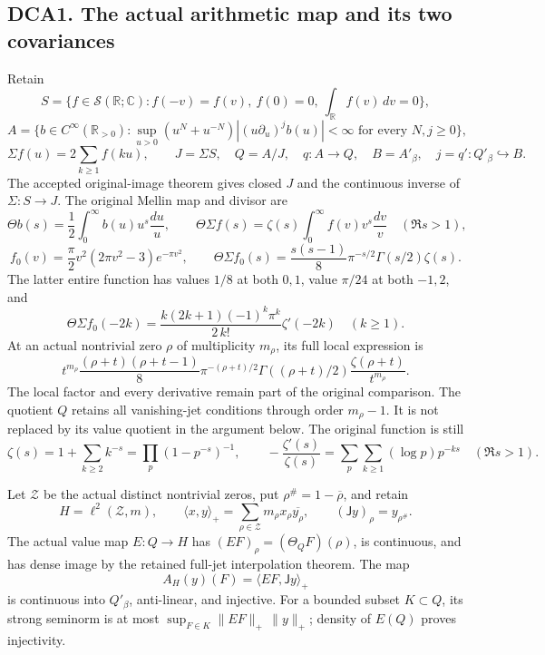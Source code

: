 \subsection{DCA1. The actual arithmetic map and its two
covariances}\label{dca1.-the-actual-arithmetic-map-and-its-two-covariances}

Retain \[
S=\{f\in\mathcal S(\mathbb R;\mathbb C):f(-v)=f(v),\ f(0)=0,\ \int_{\mathbb R}f(v)\,dv=0\},
\] \[
A=\{b\in C^\infty(\mathbb R_{>0}):
\sup_{u>0}(u^N+u^{-N})|(u\partial_u)^j b(u)|<\infty
\text{ for every }N,j\geq0\},
\] \[
\Sigma f(u)=2\sum_{k\geq1}f(ku),\qquad
J=\Sigma S,\quad Q=A/J,\quad q:A\to Q,\quad
B=A'_\beta,\quad j=q':Q'_\beta\hookrightarrow B.
\tag{DCA1.1}
\] The accepted original-image theorem gives closed \(J\) and the
continuous inverse of \(\Sigma:S\to J\). The original Mellin map and
divisor are \[
\Theta b(s)=\frac12\int_0^\infty b(u)u^s\frac{du}{u},\qquad
\Theta\Sigma f(s)=\zeta(s)\int_0^\infty f(v)v^s\frac{dv}{v}
\quad(\Re s>1),
\] \[
f_0(v)=\frac\pi2v^2(2\pi v^2-3)e^{-\pi v^2},\qquad
\Theta\Sigma f_0(s)=\frac{s(s-1)}8\pi^{-s/2}\Gamma(s/2)\zeta(s).
\tag{DCA1.2}
\] The latter entire function has values \(1/8\) at both \(0,1\), value
\(\pi/24\) at both \(-1,2\), and \[
\Theta\Sigma f_0(-2k)
=\frac{k(2k+1)(-1)^k\pi^k}{2\,k!}\zeta'(-2k)
\quad(k\geq1).
\tag{DCA1.3}
\] At an actual nontrivial zero \(\rho\) of multiplicity \(m_\rho\), its
full local expression is \[
t^{m_\rho}\frac{(\rho+t)(\rho+t-1)}8
\pi^{-(\rho+t)/2}\Gamma((\rho+t)/2)
\frac{\zeta(\rho+t)}{t^{m_\rho}}.
\tag{DCA1.4}
\] The local factor and every derivative remain part of the original
comparison. The quotient \(Q\) retains all vanishing-jet conditions
through order \(m_\rho-1\). It is not replaced by its value quotient in
the argument below. The original function is still \[
\zeta(s)=1+\sum_{k\geq2}k^{-s}=\prod_p(1-p^{-s})^{-1},\qquad
-\frac{\zeta'(s)}{\zeta(s)}
=\sum_p\sum_{k\geq1}(\log p)p^{-ks}\quad(\Re s>1).
\tag{DCA1.5}
\]

Let \(\mathscr Z\) be the actual distinct nontrivial zeros, put
\(\rho^\#=1-\overline\rho\), and retain \[
H=\ell^2(\mathscr Z,m),\qquad
\langle x,y\rangle_+=\sum_{\rho\in\mathscr Z}m_\rho x_\rho\overline{y_\rho},\qquad
(\mathsf Jy)_\rho=y_{\rho^\#}.
\tag{DCA1.6}
\] The actual value map \(E:Q\to H\) has
\((EF)_\rho=(\Theta_QF)(\rho)\), is continuous, and has dense image by
the retained full-jet interpolation theorem. The map \[
A_H(y)(F)=\langle EF,\mathsf Jy\rangle_+
\tag{DCA1.7}
\] is continuous into \(Q'_\beta\), anti-linear, and injective. For a
bounded subset \(K\subset Q\), its strong seminorm is at most
\(\sup_{F\in K}\|EF\|_+\,\|y\|_+\); density of \(E(Q)\) proves
injectivity.

